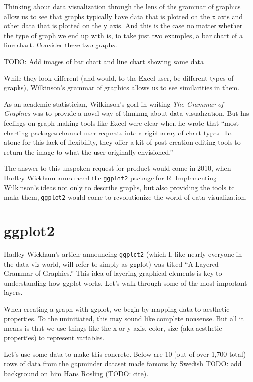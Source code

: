 \documentclass[
]{book}
\begin{document}
Thinking about data visualization through the lens of the grammar of graphics allow us to see that graphs typically have data that is plotted on the x axis and other data that is plotted on the y axis. And this is the case no matter whether the type of graph we end up with is, to take just two examples, a bar chart of a line chart. Consider these two graphs:

TODO: Add images of bar chart and line chart showing same data

While they look different (and would, to the Excel user, be different types of graphs), Wilkinson's grammar of graphics allows us to see similarities in them.

As an academic statistician, Wilkinson's goal in writing \emph{The Grammar of Graphics} was to provide a novel way of thinking about data visualization. But his feelings on graph-making tools like Excel were clear when he wrote that ``most charting packages channel user requests into a rigid array of chart types. To atone for this lack of flexibility, they offer a kit of post-creation editing tools to return the image to what the user originally envisioned.''

The answer to this unspoken request for product would come in 2010, when \href{https://vita.had.co.nz/papers/layered-grammar.html}{Hadley Wickham announced the \texttt{ggplot2} package for R}. Implementing Wilkinson's ideas not only to describe graphs, but also providing the tools to make them, \texttt{ggplot2} would come to revolutionize the world of data visualization.

\hypertarget{ggplot2}{%
\section{ggplot2}\label{ggplot2}}

Hadley Wickham's article announcing \texttt{ggplot2} (which I, like nearly everyone in the data viz world, will refer to simply as ggplot) was titled ``A Layered Grammar of Graphics.'' This idea of layering graphical elements is key to understanding how ggplot works. Let's walk through some of the most important layers.

When creating a graph with ggplot, we begin by mapping data to aesthetic properties. To the uninitiated, this may sound like complete nonsense. But all it means is that we use things like the x or y axis, color, size (aka aesthetic properties) to represent variables.

Let's use some data to make this concrete. Below are 10 (out of over 1,700 total) rows of data from the gapminder dataset made famous by Swedish TODO: add background on him Hans Rosling (TODO: cite).
\end{document}
